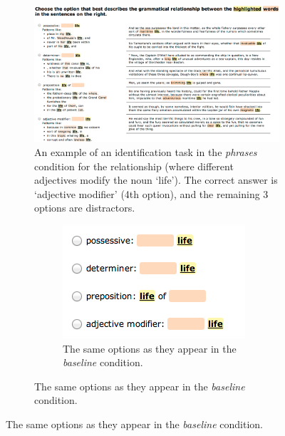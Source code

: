 \begin{figure}[th]
	\begin{subfigure} {1.3\columnwidth}
			\centering
	\includegraphics[width=1.2\columnwidth]{fig/task}
	\caption{\label{fig:task} An example of an identification task in the \emph{phrases} condition for the relationship  (where different adjectives modify the noun `life'). The correct answer is `adjective modifier' (4th option), and the remaining 3 options are distractors.}
	\end{subfigure}
	\qquad\qquad\qquad
	\begin{subfigure}{0.7\columnwidth}
		\begin{subfigure}{0.7\columnwidth}
				\centering
		\includegraphics[width=0.9\columnwidth]{fig/baseline-choices}
	    \caption {The same options as they appear in the \emph{baseline} condition. \label{fig:baseline-choices}}
	    \end{subfigure}



\end{subfigure}
\end{figure}
